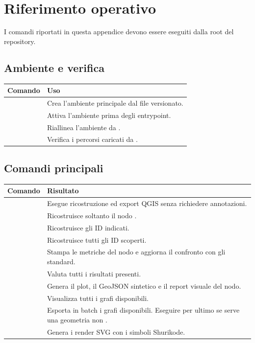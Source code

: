 \chapter{Riferimento operativo}
\label{chap:reference}

I comandi riportati in questa appendice devono essere eseguiti dalla root del
repository.

\section{Ambiente e verifica}

\begin{longtable}{P{0.48\textwidth}P{0.40\textwidth}}
\toprule
\textbf{Comando} & \textbf{Uso}\\
\midrule\endhead
{} & Crea l'ambiente principale dal file versionato.\\
 & Attiva l'ambiente prima degli entrypoint.\\
 & Riallinea l'ambiente da .\\
 & Verifica i percorsi caricati da .\\
\bottomrule
\end{longtable}

\section{Comandi principali}

\begin{longtable}{P{0.43\textwidth}P{0.45\textwidth}}
\toprule
\textbf{Comando} & \textbf{Risultato}\\
\midrule\endhead
{} & Esegue ricostruzione ed export QGIS senza richiedere annotazioni.\\
 & Ricostruisce soltanto il nodo .\\
 & Ricostruisce gli ID indicati.\\
 & Ricostruisce tutti gli ID scoperti.\\
 & Stampa le metriche del nodo e aggiorna il confronto con gli standard.\\
 & Valuta tutti i risultati presenti.\\
 & Genera il plot, il GeoJSON sintetico e il report visuale del nodo.\\
 & Visualizza tutti i grafi disponibili.\\
 & Esporta in batch i grafi disponibili. Eseguire per ultimo se serve una geometria non .\\
 & Genera i render SVG con i simboli Shurikode.\\
\bottomrule
\end{longtable}

